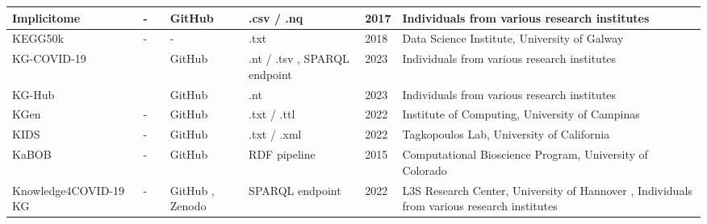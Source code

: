 \documentclass{article}
\begin{document}
\begin{landscape}
\begin{xltabular}{\textwidth}{p{3cm}|p{2.2cm}|p{2.2cm}|p{2.2cm}|p{2.2cm}|p{1cm}|p{6cm}}
\hline


Implicitome
&
-
&
\cite{implicitome_publication}
&
GitHub
\cite{implicitome_github}
&
.csv / .nq
\cite{implicitome_data}
&
2017
&
Individuals from various research institutes
\\


\hline


KEGG50k
&
-
&
\cite{kegg50k_publication}
&
-
&
.txt
\cite{kegg50k_data}
&
2018
&
Data Science Institute, University of Galway
\cite{kegg50k_group}
\\


\hline


KG-COVID-19
&
\cite{kgcovid19_website}
&
\cite{kgcovid19_publication}
&
GitHub
\cite{kgcovid19_github}
&
.nt / .tsv
\cite{kgcovid19_data1},
SPARQL endpoint
\cite{kgcovid19_data2}
&
2023
&
Individuals from various research institutes
\\


\hline


KG-Hub
&
\cite{kghub_website}
&
\cite{kghub_publication}
&
GitHub
\cite{kghub_github}
&
.nt
\cite{kghub_data}
&
2023
&
Individuals from various research institutes
\\


\hline


KGen
&
-
&
\cite{kgen_publication}
&
GitHub
\cite{kgen_github}
&
.txt / .ttl
\cite{kgen_data}
&
2022
&
Institute of Computing, University of Campinas
\cite{kgen_group}
\\


\hline


KIDS
&
-
&
\cite{kids_publication}
&
GitHub
\cite{kids_github}
&
.txt / .xml
\cite{kids_data}
&
2022
&
Tagkopoulos Lab, University of California
\cite{kids_group}
\\


\hline


KaBOB
&
-
&
\cite{kabob_publication}
&
GitHub
\cite{kabob_github}
&
RDF pipeline
\cite{kabob_github}
&
2015
&
Computational Bioscience Program, University of Colorado
\cite{kabob_group}
\\


\hline


Knowledge4COVID-19 KG
&
-
&
\cite{knowledge4covid19_publication}
&
GitHub
\cite{knowledge4covid19_github},
Zenodo
\cite{knowledge4covid19_zenodo}
&
SPARQL endpoint
\cite{knowledge4covid19_data}
&
2022
&
L3S Research Center, University of Hannover
\cite{knowledge4covid19_group},
Individuals from various research institutes
\\



\end{xltabular}
\end{landscape}
\end{document}
